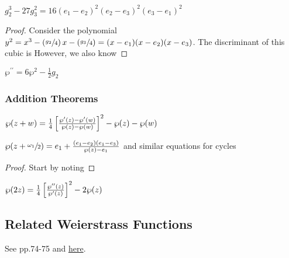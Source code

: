 \documentclass{article}
\begin{document}
\begin{lemma}
	$g_2^3 - 27g_3^2 = 16(e_1 - e_2)^2(e_2 - e_3)^2 (e_3 - e_1)^2$
\end{lemma}
\begin{proof}
	Consider the polynomial $y^2 = x^3 - \left( \sfrac{g_2}{4} \right)x - \left( \sfrac{g_3}{4} \right) = (x-e_1)(x-e_2)(x-e_3)$. The discriminant of this cubic is 
	However, we also know 
\end{proof}


\begin{corollary}
	$\wp^{\prime \prime} = 6\wp^2 - \frac{1}{2}g_2
	$\end{corollary}

\subsubsection{Addition Theorems}

\begin{prop}
	$\wp(z+w) = \frac{1}{4} \left[ \frac{\wp^\prime(z) - \wp^\prime(w)}{\wp(z) - \wp(w)} \right]^2 - \wp(z) - \wp(w)$
\end{prop}
\begin{corollary}
	$\wp(z + \sfrac{\omega_1}{2}) = e_1 + \frac{(e_1 - e_2)(e_1 - e_3)}{\wp(z) - e_1}$ and similar equations for cycles 
\end{corollary}
\begin{proof}
	Start by noting 
\end{proof}


\begin{corollary}
	$\wp(2z) = \frac{1}{4} \left[ \frac{\wp^{\prime \prime}(z)}{\wp^\prime(z)} \right]^2 - 2\wp(z)$
\end{corollary}

\subsection{Related Weierstrass Functions}\label{subsec: related Weierstrass functions}
See \cite{Dubrovin2009} pp.74-75 and \href{https://en.wikipedia.org/wiki/Weierstrass_functions}{here}. 
\end{document}
